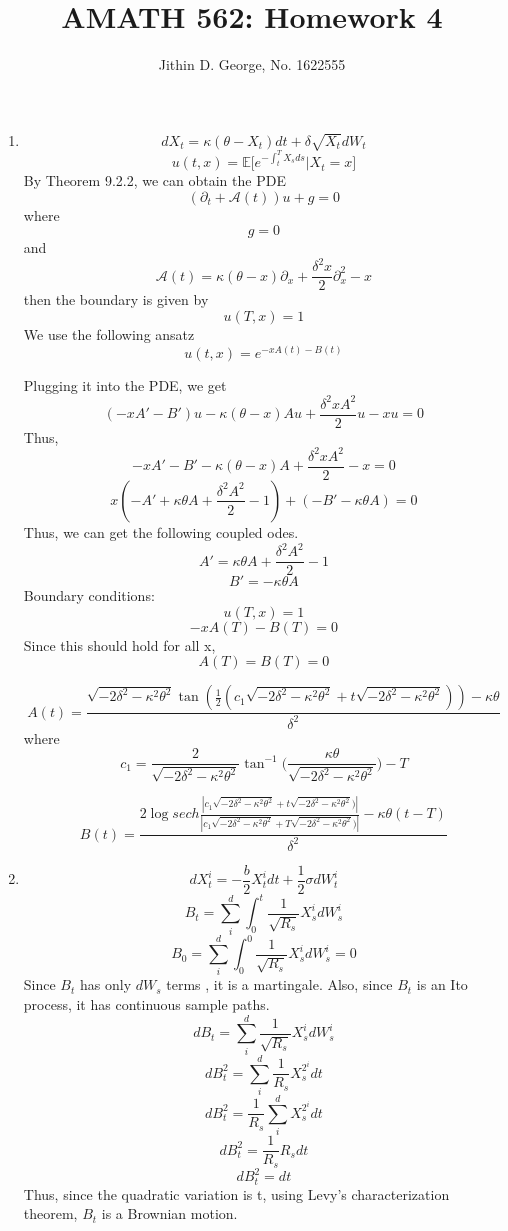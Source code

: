 \documentclass[a4paper,11pt]{article}
\title{AMATH 562: Homework 4}
\author{Jithin D. George, No. 1622555}
\begin{document}
\maketitle
\begin{enumerate}

\item 
\[dX_t = \kappa(\theta -X_t)dt + \delta \sqrt{X_t} dW_t\]
\[u(t,x) = \mathbb{E}\bigg[e^{- \int_t^T X_s ds}|X_t = x\bigg]\]
By Theorem 9.2.2, we can obtain the PDE
\[(\partial_t + \mathcal{A}(t))u +g = 0\]
where 
\[g = 0\]
 and 
\[\mathcal{A}(t)  =\kappa(\theta -x)\partial_x+\frac{\delta^2 x}{2}\partial_x^2 - x\]
then the boundary is given by
\[u(T,x) = 1\]
We use the following ansatz
\[u(t,x)= e^{-xA(t)-B(t)}\]

Plugging it into the PDE, we get
\[(-xA'-B')u-\kappa(\theta -x)Au+\frac{\delta^2 xA^2}{2}u-xu=0\]
Thus,
\[-xA'-B'-\kappa(\theta -x)A+\frac{\delta^2 x A^2}{2}-x=0\]
\[x(-A'+\kappa\theta A+\frac{\delta^2 A^2}{2}-1)+(-B'-\kappa\theta A)=0\]
Thus, we can get the following coupled odes.
\[A'=\kappa\theta A+\frac{\delta^2 A^2}{2}-1\]
\[B'=-\kappa\theta A\]
Boundary conditions:
\[u(T,x)=1\]
\[-xA(T)-B(T)=0\]
Since this should hold for all x,
\[A(T)=B(T)=0\]

\[A(t) = \frac{\sqrt{-2\delta^2-\kappa^2\theta^2}\tan(\frac{1}{2}(c_1\sqrt{-2\delta^2-\kappa^2\theta^2}+t\sqrt{-2\delta^2-\kappa^2\theta^2} ) )-\kappa\theta}{\delta^2}\]
where
\[c_1 = \frac{2}{\sqrt{-2\delta^2-\kappa^2\theta^2}}\tan^{-1}\bigg(\frac{\kappa\theta}{\sqrt{-2\delta^2-\kappa^2\theta^2}}\bigg)-T\]

\[B(t) = \frac{2\log sech \frac{|c_1\sqrt{-2\delta^2-\kappa^2\theta^2}+t\sqrt{-2\delta^2-\kappa^2\theta^2} )|}{ |c_1\sqrt{-2\delta^2-\kappa^2\theta^2}+T\sqrt{-2\delta^2-\kappa^2\theta^2} )|}-\kappa\theta (t-T)}{\delta^2}\]

\item 
\[dX_t^i = -\frac{b}{2}X_t^{i}dt+ \frac{1}{2} \sigma dW_t^i\]
\[B_t = \sum_i^d \int_0^t \frac{1}{\sqrt{R_s}}X_s^{i}dW_s^{i}\]
\[B_0 = \sum_i^d \int_0^0 \frac{1}{\sqrt{R_s}}X_s^{i}dW_s^{i}=0\]
Since $B_t$ has only $dW_s$ terms , it is a martingale.
Also, since $B_t$ is an Ito process, it has continuous sample paths.
\[dB_t = \sum_i^d \frac{1}{\sqrt{R_s}}X_s^{i}dW_s^{i}\] 
\[dB_t^2 = \sum_i^d \frac{1}{R_s}X_s^{2^{i}}dt\]
\[dB_t^2 = \frac{1}{R_s} \sum_i^d X_s^{2^{i}}dt\]
\[dB_t^2 = \frac{1}{R_s} R_s dt\]
\[dB_t^2 = dt\]
Thus, since the quadratic variation is t, using Levy's characterization theorem, $B_t$ is a Brownian motion.


\end{enumerate}
\end{document}
